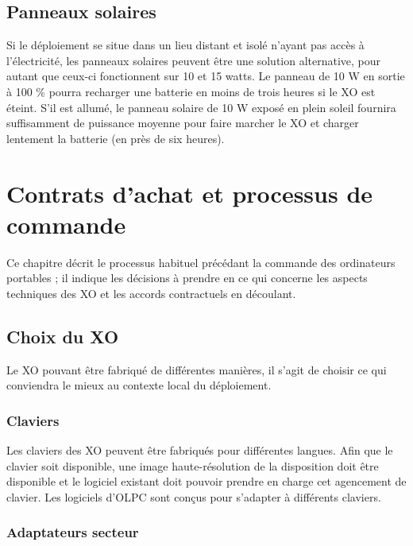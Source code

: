 \documentclass[12pt]{article}
\begin{document}
\subsection{Panneaux solaires}
\label{sec-7-1}


Si le déploiement se situe dans un lieu distant et isolé n'ayant pas accès
à l'électricité, les panneaux solaires peuvent être une solution
alternative, pour autant que ceux-ci fonctionnent sur 10 et 15 watts. Le
panneau de 10 W en sortie à 100 \% pourra recharger une batterie en moins de
trois heures si le XO est éteint. S'il est allumé, le panneau solaire de 10
W exposé en plein soleil fournira suffisamment de puissance moyenne pour
faire marcher le XO et charger lentement la batterie (en près de six
heures).
\section{Contrats d'achat et processus de commande}
\label{sec-8}


Ce chapitre décrit le processus habituel précédant la commande des
ordinateurs portables ; il indique les décisions à prendre en ce qui
concerne les aspects techniques des XO et les accords contractuels en
découlant.
\subsection{Choix du XO}
\label{sec-8-1}



Le XO pouvant être fabriqué de différentes manières, il s'agit de choisir
ce qui conviendra le mieux au contexte local du déploiement.
\subsubsection{Claviers}
\label{sec-8-1-1}



Les claviers des XO peuvent être fabriqués pour différentes langues. Afin
que le clavier soit disponible, une image haute-résolution de la
disposition doit être disponible et le logiciel existant doit pouvoir
prendre en charge cet agencement de clavier. Les logiciels d'OLPC sont
conçus pour s'adapter à différents claviers.
\subsubsection{Adaptateurs secteur}
\label{sec-8-1-2}


\end{document}
